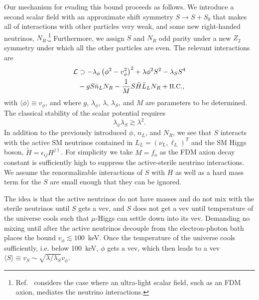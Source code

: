 \documentclass[twocolumn,preprintnumbers,
endnote,prl]{revtex4-1}
\newcommand{\lsim}{\lesssim}
\newcommand{\gsim}{\gtrsim}
\begin{document}
Our mechanism for evading this bound proceeds as follows. We introduce a second scalar field with an approximate shift symmetry $S \to S + S_0$ that makes all of interactions with other particles very weak, and some new right-handed neutrinos, $N_R$.\footnote{Ref.~\cite{Berlin:2016woy} considers the case where an ultra-light scalar field, such as an FDM axion, mediates the neutrino interactions.} Furthermore, we assign $S$ and $N_R$ odd parity under a new $Z_2$ symmetry under which all the other particles are even. The relevant interactions are 
\begin{align}
\label{eq:Vphi}
\mathcal{L} &\supset - \lambda_{\phi} \left(\phi^2 - v_{\phi}^2\right)^2 + \lambda \phi^2 S^2 - \lambda_S S^4 \\
&- g S \bar{n}_L N_R - \frac{1}{M} S \tilde{H} \bar{L}_L N_R + \text{\small H.C.} , \nonumber
\end{align}
with $\langle \phi \rangle \equiv v_{\phi}$, and where $g$, $\lambda_{\phi}$, $\lambda$, $\lambda_S$, and $M$ are parameters to be determined. The classical stability of the scalar potential requires 
\begin{equation}
\label{eq:stab}
\lambda_{\phi} \lambda_S \gsim \lambda^2 . 
\end{equation}
In addition to the previously introduced $\phi$, $n_L$, and $N_R$, we see that $S$ interacts with the active SM neutrinos contained in $L_L = (\nu_L, \ell_L)^T$ and the SM Higgs boson, $\tilde{H} = \epsilon_{ij} H^{j \dagger}$. For simplicity we take $M = f_a$ as the FDM axion decay constant is sufficiently high to suppress the active-sterile neutrino interactions. We assume the renormalizable interactions of $S$ with $H$ as well as a hard mass term for the $S$ are small enough that they can be ignored.  

The idea is that the active neutrinos do not have masses and do not mix with the sterile neutrinos until $S$ gets a vev, and $S$ does not get a vev until temperature of the universe cools such that $\mu$-Higgs can settle down into its vev. Demanding no mixing until after the active neutrinos decouple from the electron-photon bath places the bound $v_{\phi} \lsim 100$~keV.  Once the temperature of the universe cools sufficiently, i.e. below 100~keV, $\phi$ gets a vev, which then leads to a vev $\langle S \rangle \equiv v_S \sim \sqrt{\lambda / \lambda_S} v_{\phi}$. 
\end{document}
